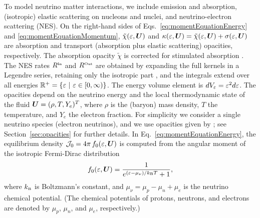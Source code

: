 \documentclass[10pt,preprint]{aastex}
\begin{document}
To model neutrino matter interactions, we include emission and absorption, (isotropic) elastic scattering on nucleons and nuclei, and neutrino-electron scattering (NES).  
On the right-hand sides of Eqs.~\eqref{eq:momentEquationEnergy} and \eqref{eq:momentEquationMomentum}, $\tilde{\chi}(\varepsilon,\boldsymbol{U})$ and $\kappa(\varepsilon,\boldsymbol{U})=\tilde{\chi}(\varepsilon,\boldsymbol{U})+\sigma(\varepsilon,\boldsymbol{U})$ are absorption and transport (absorption plus elastic scattering) opacities, respectively.  
The absorption opacity $\tilde{\chi}$ is corrected for stimulated absorption \citep[cf.][]{mezzacappaBruenn_1993a}.  
The NES rates $R^{\mbox{\tiny In}}$ and $R^{\mbox{\tiny Out}}$ are obtained by expanding the full kernels in a Legendre series, retaining only the isotropic part \citep[see, e.g.,][]{cernohorsky_1994}, and the integrals extend over all energies $\mathbb{R}^{+}=\{\varepsilon~|~\varepsilon\in[0,\infty)\}$.  
The energy volume element is $dV_{\varepsilon}=\varepsilon^{2}d\varepsilon$.  
The opacities depend on the neutrino energy and the local thermodynamic state of the fluid $\boldsymbol{U}=(\rho,T,Y_{e})^{T}$, where $\rho$ is the (baryon) mass density, $T$ the temperature, and $Y_{e}$ the electron fraction.  
For simplicity we consider a single neutrino species (electron neutrinos), and we use opacities given by \citet{bruenn_1985}; see Section~\ref{sec:opacities} for further details.  
In Eq.~\eqref{eq:momentEquationEnergy}, the equilibrium density $\mathcal{J}_{0}=4\pi\,f_{0}(\varepsilon,\boldsymbol{U})$ is computed from the angular moment of the isotropic Fermi-Dirac distribution
\begin{equation}
  f_{0}(\varepsilon,\boldsymbol{U})=\frac{1}{e^{(\varepsilon-\mu_{\nu})/k_{\mbox{\tiny B}}T}+1},
\end{equation}
where $k_{\mbox{\tiny B}}$ is Boltzmann's constant, and $\mu_{\nu}=\mu_{p}-\mu_{n}+\mu_{e}$ is the neutrino chemical potential.  
(The chemical potentials of protons, neutrons, and electrons are denoted by $\mu_{p}$, $\mu_{n}$, and $\mu_{e}$, respectively.)
\end{document}
